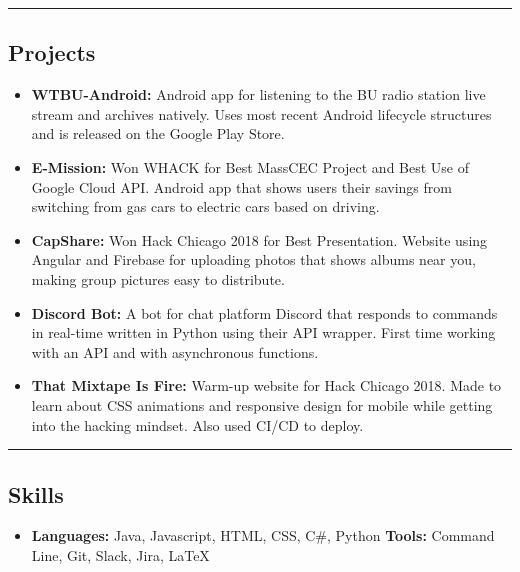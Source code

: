 \documentclass[11pt,letterpaper]{article}
\begin{document}
\hrule
\vspace{-0.4em}
\subsection*{Projects}

\begin{itemize}
	\parskip=0.1em
	
	\item \textbf{WTBU-Android:}
		Android app for listening to the BU radio station live stream and archives natively. Uses most recent Android lifecycle structures and is released on the Google Play Store. 
	
	\item \textbf{E-Mission:}
		Won WHACK for Best MassCEC Project and Best Use of Google Cloud API. Android app that shows users their savings from switching from gas cars to electric cars based on driving. 
	
	\item \textbf{CapShare:}
		Won Hack Chicago 2018 for Best Presentation. Website using Angular and Firebase for uploading photos that shows albums near you, making group pictures easy to distribute. 
		
	\item \textbf{Discord Bot:}
		A bot for chat platform Discord that responds to commands in real-time written in Python using their API wrapper. First time working with an API and with asynchronous functions.
		
	\item \textbf{That Mixtape Is Fire:}
		Warm-up website for Hack Chicago 2018. Made to learn about CSS animations and responsive design for mobile while getting into the hacking mindset. Also used CI/CD to deploy. 

\end{itemize}

\hrule
\vspace{-0.4em}
\subsection*{Skills}

\begin{itemize}
	\parskip=0.1em

	\item \textbf{Languages:} Java, Javascript, HTML, CSS, C\#, Python \textbullet 
		\textbf{Tools:} Command Line, Git, Slack, Jira, \LaTeX
	
\end{itemize}
\end{document}

